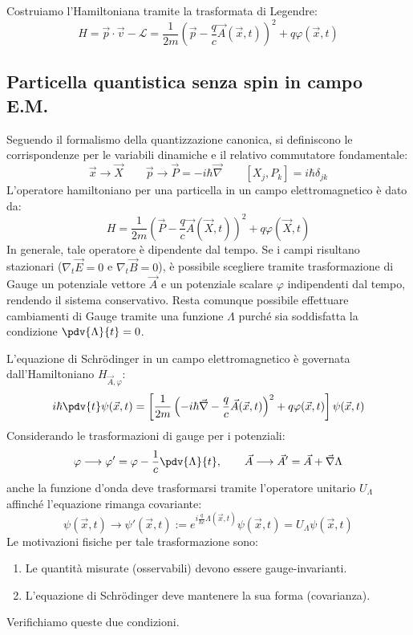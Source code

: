 Costruiamo l'Hamiltoniana tramite la trasformata di Legendre:
\begin{equation}
    H = \vec{p} \cdot \vec{v} - \mathcal{L} = \frac{1}{2m} \left( \vec{p} - \frac{q}{c}\vec{A}(\vec{x},t) \right)^2 + q\varphi(\vec{x},t)
\end{equation}

\subsection{Particella quantistica senza spin in campo E.M.}

Seguendo il formalismo della quantizzazione canonica, si definiscono le corrispondenze per le variabili dinamiche e il relativo commutatore fondamentale:
\[
\vec{x} \longrightarrow \vec{X} \qquad \vec{p} \longrightarrow \vec{P} = -i\hbar \vec{\nabla} \qquad [X_j, P_k] = i\hbar \delta_{jk}
\]
L'operatore hamiltoniano per una particella in un campo elettromagnetico è dato da:
\begin{equation}
    H = \frac{1}{2m} \left( \vec{P} - \frac{q}{c} \vec{A}(\vec{X}, t) \right)^2 + q \varphi(\vec{X}, t)
\end{equation}
In generale, tale operatore è dipendente dal tempo. Se i campi risultano stazionari (\(\nabla_t\vec{E}= 0\) e \(\nabla_t\vec{B} = 0\)), 
è possibile scegliere tramite trasformazione di Gauge un potenziale vettore \(\vec{A}\) e un potenziale scalare \(\varphi\) indipendenti dal tempo, rendendo il sistema conservativo. 
Resta comunque possibile effettuare cambiamenti di Gauge tramite una funzione \(\Lambda\) purché sia soddisfatta la condizione \(\pdv{\Lambda}{t} = 0\).

L'equazione di Schrödinger in un campo elettromagnetico è governata dall'Hamiltoniano \( H_{\vec{A}, \varphi} \):
\[
i\hbar \pdv{t} \psi(\vec{x},t) = \left[ \frac{1}{2m} \left( -i\hbar \vec{\nabla} - \frac{q}{c} \vec{A}(\vec{x},t) \right)^2 + q \varphi(\vec{x},t) \right] \psi(\vec{x},t)
\]
Considerando le trasformazioni di gauge per i potenziali:
\[
\varphi \longrightarrow \varphi' = \varphi - \frac{1}{c} \pdv{\Lambda}{t}, \qquad \vec{A} \longrightarrow \vec{A}' = \vec{A} + \vec{\nabla} \Lambda
\]
anche la funzione d'onda deve trasformarsi tramite l'operatore unitario \( U_\Lambda \) affinché l'equazione rimanga covariante:
\[
\psi(\vec{x},t) \longrightarrow \psi'(\vec{x},t) := e^{i \frac{q}{\hbar c} \Lambda(\vec{x},t)} \psi(\vec{x},t) = U_\Lambda \psi(\vec{x},t)
\]
Le motivazioni fisiche per tale trasformazione sono:
\begin{enumerate}
    \item Le quantità misurate (osservabili) devono essere gauge-invarianti.
    \item L'equazione di Schrödinger deve mantenere la sua forma (covarianza).
\end{enumerate}
Verifichiamo queste due condizioni.


